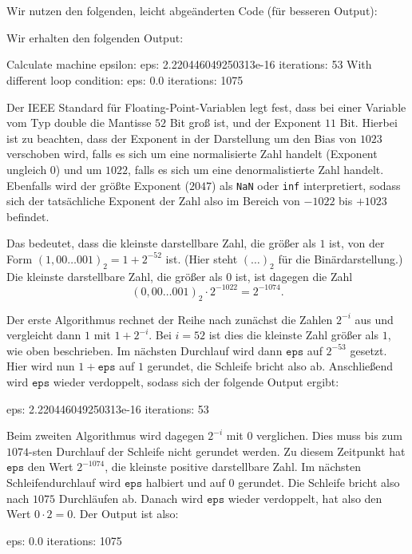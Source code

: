 \section{}

Wir nutzen den folgenden, leicht abgeänderten Code (für besseren Output):



Wir erhalten den folgenden Output:

\begin{consoleoutput}
Calculate machine epsilon:
eps: 2.220446049250313e-16
iterations: 53
With different loop condition:
eps: 0.0
iterations: 1075
\end{consoleoutput}

Der IEEE Standard für Floating-Point-Variablen legt fest, dass bei einer Variable vom Typ double die Mantisse $52$ Bit groß ist, und der Exponent $11$ Bit.
Hierbei ist zu beachten, dass der Exponent in der Darstellung um den Bias von $1023$ verschoben wird, falls es sich um eine normalisierte Zahl handelt (Exponent ungleich $0$) und um $1022$, falls es sich um eine denormalistierte Zahl handelt.
Ebenfalls wird der größte Exponent ($2047$) als \texttt{NaN} oder \texttt{inf} interpretiert, sodass sich der tatsächliche Exponent der Zahl also im Bereich von $-1022$ bis $+1023$ befindet.

Das bedeutet, dass die kleinste darstellbare Zahl, die größer als $1$ ist, von der Form $(1,00\dots001)_2 = 1 + 2^{-52}$ ist.
(Hier steht $(\dots)_2$ für die Binärdarstellung.)
Die kleinste darstellbare Zahl, die größer als $0$ ist, ist dagegen die Zahl
\[
    (0,00\dots001)_2 \cdot 2^{-1022}
  = 2^{-1074}.
\]

Der erste Algorithmus rechnet der Reihe nach zunächst die Zahlen $2^{-i}$ aus und vergleicht dann $1$ mit $1 + 2^{-i}$.
Bei $i = 52$ ist dies die kleinste Zahl größer als $1$, wie oben beschrieben.
Im nächsten Durchlauf wird dann $\mathtt{eps}$ auf $2^{-53}$ gesetzt.
Hier wird nun $1 + \mathtt{eps}$ auf $1$ gerundet, die Schleife bricht also ab.
Anschließend wird $\mathtt{eps}$ wieder verdoppelt, sodass sich der folgende Output ergibt:
\begin{consoleoutput}
eps: 2.220446049250313e-16
iterations: 53
\end{consoleoutput}

Beim zweiten Algorithmus wird dagegen $2^{-i}$ mit $0$ verglichen.
Dies muss bis zum $1074$-sten Durchlauf der Schleife nicht gerundet werden.
Zu diesem Zeitpunkt hat $\mathtt{eps}$ den Wert $2^{-1074}$, die kleinste positive darstellbare Zahl.
Im nächsten Schleifendurchlauf wird $\mathtt{eps}$ halbiert und auf $0$ gerundet.
Die Schleife bricht also nach $1075$ Durchläufen ab.
Danach wird $\mathtt{eps}$ wieder verdoppelt, hat also den Wert $0 \cdot 2 = 0$.
Der Output ist also:
\begin{consoleoutput}
eps: 0.0
iterations: 1075
\end{consoleoutput}

